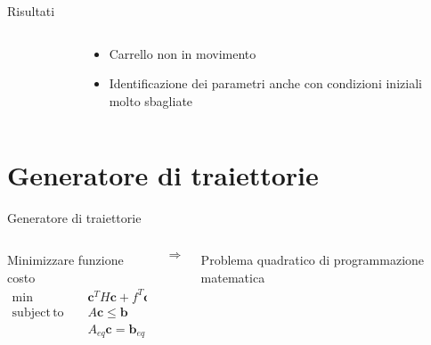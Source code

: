 \documentclass[]{beamer}
\DeclareMathOperator*{\subjectto}{subject\hspace{2pt}to}
\begin{document}
	\begin{frame}{Risultati}
		\centering
		\begin{columns}
			\begin{column}{.5\textwidth}
				\centering
				\begin{figure}
					
				\end{figure}
			\end{column}
			\begin{column}{.5\textwidth}
				\centering
				\begin{itemize}
					\item Carrello non in movimento
					\item Identificazione dei parametri anche con condizioni iniziali molto sbagliate
				\end{itemize}
			\end{column}
		\end{columns}
	\end{frame}
	
	
	\section{Generatore di traiettorie}
	
	
	\begin{frame}{Generatore di traiettorie}
		\centering 
		\begin{columns}
			\begin{column}{.45\textwidth}
				\centering
				Minimizzare funzione costo
				\begin{alignat}{2}
					\min\qquad & \mathbf{c}^TH\mathbf{c} + f^T\mathbf{c} \nonumber \\
					\subjectto \qquad & A\mathbf{c} \le \mathbf{b} \nonumber \\
					& A_{eq}\mathbf{c} = \mathbf{b}_{eq} \nonumber
				\end{alignat}
			\end{column}
			\begin{column}{.1\textwidth}
				\centering
				\begin{equation*}
					\Rightarrow
				\end{equation*}
			\end{column}
			\begin{column}{.45\textwidth}
				\centering
				Problema quadratico di programmazione matematica
			\end{column}
		\end{columns}
		\begin{figure}
			
		\end{figure}
	\end{frame}
\end{document}
